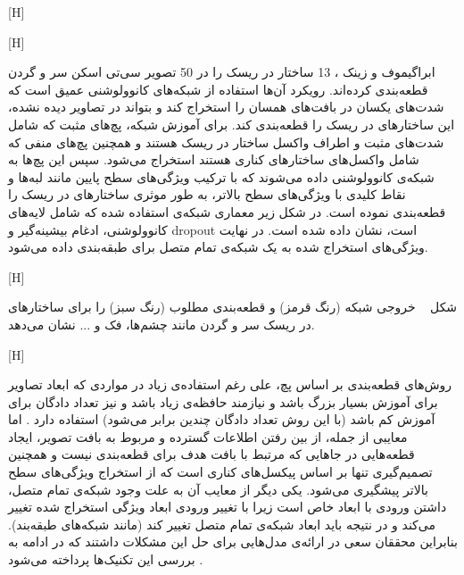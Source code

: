  [H]

[H]

ابراگیموف و زینک ، 13 ساختار در ریسک را در 50 تصویر سی‌تی اسکن سر و گردن قطعه‌بندی کرده‌اند. رویکرد آن‌ها استفاده از شبکه‌های کانوولوشنی عمیق است که شدت‌های یکسان در بافت‌های همسان را استخراج کند و بتواند در تصاویر دیده‌ نشده‌، این ساختارهای در ریسک را قطعه‌بندی کند. برای آموزش شبکه، پچ‌های مثبت که شامل شدت‌های مثبت و اطراف واکسل ساختار در ریسک هستند و همچنین پچ‌های منفی که شامل واکسل‌های ساختارهای کناری هستند استخراج می‌شود. سپس این پچ‌ها به شبکه‌ی کانوولوشنی داده می‌شوند که با ترکیب ویژگی‌های سطح پایین مانند لبه‌ها و نقاط کلیدی با ویژگی‌های سطح بالاتر، به طور موثری ساختارهای در ریسک را قطعه‌بندی نموده است. در شکل زیر معماری شبکه‌ی استفاده شده که شامل لایه‌های کانوولوشنی، ادغام بیشینه‌گیر و dropout است، نشان داده شده است. در نهایت ویژگی‌های استخراج شده به یک شبکه‌ی تمام متصل برای طبقه‌بندی داده می‌شود.

[H]

شکل ~ خروجی شبکه (رنگ قرمز) و قطعه‌بندی مطلوب (رنگ سبز) را برای ساختارهای در ریسک سر و گردن مانند چشم‌ها، فک و ... نشان می‌دهد.

[H]

روش‌های قطعه‌بندی بر اساس پچ، علی رغم استفاده‌ی زیاد در مواردی که ابعاد تصاویر برای آموزش بسیار بزرگ باشد و نیازمند حافظه‌ی زیاد باشد و نیز تعداد دادگان برای آموزش کم باشد (با این روش تعداد دادگان چندین برابر می‌شود) استفاده دارد . اما معایبی از جمله، از بین رفتن اطلاعات گسترده و مربوط به بافت تصویر، ایجاد قطعه‌هایی در جاهایی که مرتبط با بافت هدف برای قطعه‌بندی نیست و همچنین تصمیم‌گیری تنها بر اساس پیکسل‌های کناری است که از استخراج ویژگی‌های سطح‌ بالاتر پیشگیری می‌شود. یکی دیگر از معایب آن به علت وجود شبکه‌ی تمام متصل، داشتن ورودی با ابعاد خاص است زیرا با تغییر ورودی ابعاد ویژگی‌ استخراج شده تغییر می‌کند و در نتیجه باید ابعاد شبکه‌ی تمام متصل تغییر کند (مانند شبکه‌های طبقه‌بند). بنابراین محققان سعی در ارائه‌ی مدل‌هایی برای حل این مشکلات داشتند که در ادامه به بررسی این تکنیک‌ها پرداخته می‌شود .

